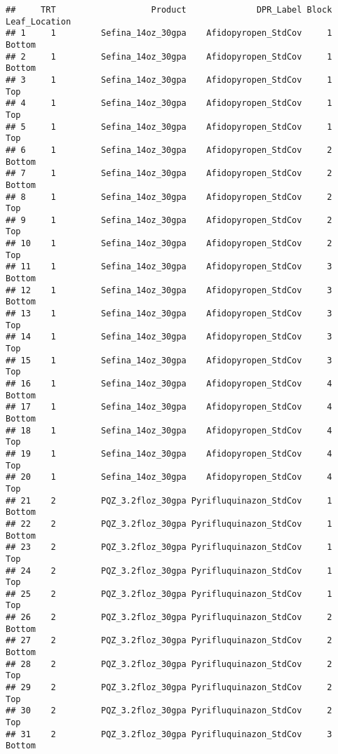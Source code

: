 \documentclass[
]{article}
\begin{document}
\begin{verbatim}
##     TRT                   Product              DPR_Label Block Leaf_Location
## 1     1         Sefina_14oz_30gpa    Afidopyropen_StdCov     1        Bottom
## 2     1         Sefina_14oz_30gpa    Afidopyropen_StdCov     1        Bottom
## 3     1         Sefina_14oz_30gpa    Afidopyropen_StdCov     1           Top
## 4     1         Sefina_14oz_30gpa    Afidopyropen_StdCov     1           Top
## 5     1         Sefina_14oz_30gpa    Afidopyropen_StdCov     1           Top
## 6     1         Sefina_14oz_30gpa    Afidopyropen_StdCov     2        Bottom
## 7     1         Sefina_14oz_30gpa    Afidopyropen_StdCov     2        Bottom
## 8     1         Sefina_14oz_30gpa    Afidopyropen_StdCov     2           Top
## 9     1         Sefina_14oz_30gpa    Afidopyropen_StdCov     2           Top
## 10    1         Sefina_14oz_30gpa    Afidopyropen_StdCov     2           Top
## 11    1         Sefina_14oz_30gpa    Afidopyropen_StdCov     3        Bottom
## 12    1         Sefina_14oz_30gpa    Afidopyropen_StdCov     3        Bottom
## 13    1         Sefina_14oz_30gpa    Afidopyropen_StdCov     3           Top
## 14    1         Sefina_14oz_30gpa    Afidopyropen_StdCov     3           Top
## 15    1         Sefina_14oz_30gpa    Afidopyropen_StdCov     3           Top
## 16    1         Sefina_14oz_30gpa    Afidopyropen_StdCov     4        Bottom
## 17    1         Sefina_14oz_30gpa    Afidopyropen_StdCov     4        Bottom
## 18    1         Sefina_14oz_30gpa    Afidopyropen_StdCov     4           Top
## 19    1         Sefina_14oz_30gpa    Afidopyropen_StdCov     4           Top
## 20    1         Sefina_14oz_30gpa    Afidopyropen_StdCov     4           Top
## 21    2         PQZ_3.2floz_30gpa Pyrifluquinazon_StdCov     1        Bottom
## 22    2         PQZ_3.2floz_30gpa Pyrifluquinazon_StdCov     1        Bottom
## 23    2         PQZ_3.2floz_30gpa Pyrifluquinazon_StdCov     1           Top
## 24    2         PQZ_3.2floz_30gpa Pyrifluquinazon_StdCov     1           Top
## 25    2         PQZ_3.2floz_30gpa Pyrifluquinazon_StdCov     1           Top
## 26    2         PQZ_3.2floz_30gpa Pyrifluquinazon_StdCov     2        Bottom
## 27    2         PQZ_3.2floz_30gpa Pyrifluquinazon_StdCov     2        Bottom
## 28    2         PQZ_3.2floz_30gpa Pyrifluquinazon_StdCov     2           Top
## 29    2         PQZ_3.2floz_30gpa Pyrifluquinazon_StdCov     2           Top
## 30    2         PQZ_3.2floz_30gpa Pyrifluquinazon_StdCov     2           Top
## 31    2         PQZ_3.2floz_30gpa Pyrifluquinazon_StdCov     3        Bottom

\end{verbatim}
\end{document}
